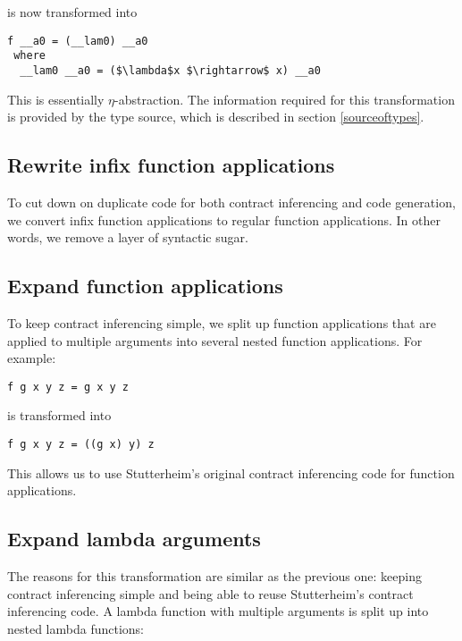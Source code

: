 \documentclass[10pt]{report}
\begin{document}
is now transformed into

\begin{lstlisting}[mathescape, caption=Result of $\eta$-abstraction transformation.]
f __a0 = (__lam0) __a0                
 where                    
  __lam0 __a0 = ($\lambda$x $\rightarrow$ x) __a0
\end{lstlisting}

This is essentially $\eta$-abstraction.
The information required for this transformation is provided by the type source,  which is described in section \ref{sourceoftypes}.

\subsection{Rewrite infix function applications}
To cut down on duplicate code for both contract inferencing and code generation, we convert infix function applications to regular function applications.
In other words, we remove a layer of syntactic sugar.

\subsection{Expand function applications}
To keep contract inferencing simple, we split up function applications that are applied to multiple arguments into several nested function applications.
For example:

\begin{lstlisting}
f g x y z = g x y z
\end{lstlisting}

is transformed into

\begin{lstlisting}[caption=Result of function application expansion transformation.]
f g x y z = ((g x) y) z
\end{lstlisting}

This allows us to use Stutterheim's original contract inferencing code for function applications.

\subsection{Expand lambda arguments}
The reasons for this transformation are similar as the previous one: keeping contract inferencing simple and being able to reuse Stutterheim's contract inferencing code.
A lambda function with multiple arguments is split up into nested lambda functions:
\end{document}
